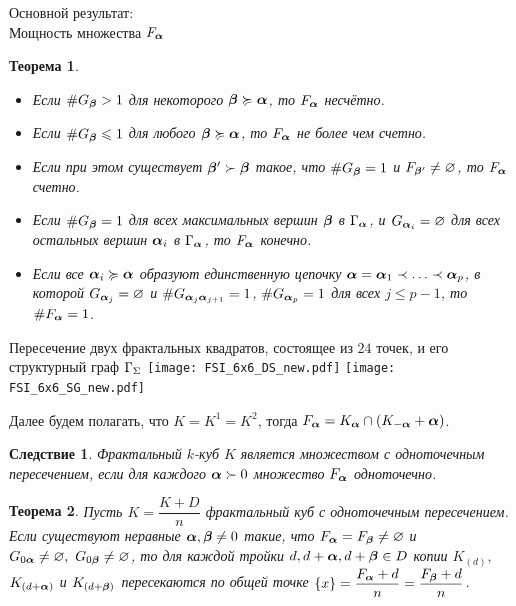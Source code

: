 \documentclass[aspectratio=1610, 10pt, notheorems]{beamer}
\newtheorem{theorem}     {Теорема}
\newtheorem{corollary}   {Следствие}
\begin{document}
\begin{frame}{Основной результат:\\Мощность множества $F_{\bm{\alpha}}$}
\begin{theorem}
\begin{itemize}[nolistsep]
\item[(1)] Если $\#G_{\bm{\beta}}>1$ для некоторого ${\bm{\beta}}\succcurlyeq{\bm{\alpha}}$, то  $F_{\bm{\alpha}}$ несчётно.

\item[(2a)] Если  $\#G_{\bm{\beta}}\leqslant1$ для любого ${\bm{\beta}}\succcurlyeq{\bm{\alpha}}$, то  $F_{\bm{\alpha}}$ не более чем счетно.

\item[(2b)] Если при этом существует ${\bm{\beta}}'\succ{\bm{\beta}}$ такое, что $\#G_{\bm{\beta}}=1$ и $F_{{\bm{\beta}}'}\neq\varnothing$, то $F_{\bm{\alpha}}$ счетно.

\item[(3)] Если  $\#G_{\bm{\beta}}=1$ для всех максимальных вершин ${\bm{\beta}}$ в $\Gamma_{\bm{\alpha}}$, и $G_{{\bm{\alpha}}_i}=\varnothing$ для всех остальных вершин ${\bm{\alpha}}_i$ в $\Gamma_{\bm{\alpha}}$, то $F_{\bm{\alpha}}$ конечно.

\item[(4)] Если все ${\bm{\alpha}}_i\succcurlyeq{\bm{\alpha}}$ образуют единственную цепочку ${\bm{\alpha}}={\bm{\alpha}}_1\prec\ldots\prec{\bm{\alpha}}_p$, в которой $G_{{\bm{\alpha}}_j}=\varnothing$ и $\# G_{{\bm{\alpha}}_j{\bm{\alpha}}_{j+1}}=1$, $\#G_{{\bm{\alpha}}_p}=1$ для всех $j\le p-1$, то $\#F_{\bm{\alpha}}=1$.
\end{itemize}
\end{theorem}
\end{frame}

\begin{frame}{Пересечение двух фрактальных квадратов, состоящее из $24$ точек, и его структурный граф $\Gamma_\Sigma$}
\texttt{[image: FSI\_6x6\_DS\_new.pdf]}
\hfill
\texttt{[image: FSI\_6x6\_SG\_new.pdf]}
\end{frame}

\begin{frame}{}
Далее будем полагать, что $K=K^1=K^2$, тогда $F_{\bm{\alpha}}=K_{\bm{\alpha}}\cap(K_{-{\bm{\alpha}}}+{\bm{\alpha}})$.
\begin{corollary}
Фрактальный $k$-куб $K$ является множеством с одноточечным пересечением, если для каждого ${\bm{\alpha}}\succ0$ множество $F_{\bm{\alpha}}$ одноточечно.
\end{corollary}
\begin{theorem}
Пусть $K=\dfrac{K+D}{n}$ фрактальный куб с одноточечным пересечением. 
Если существуют неравные ${\bm{\alpha}},{\bm{\beta}}\neq0$ такие, что $F_{\bm{\alpha}}=F_{\bm{\beta}}\neq\varnothing$ и $G_{0{\bm{\alpha}}}\neq\varnothing,\ G_{0{\bm{\beta}}}\neq\varnothing$,  то для каждой тройки $d, d+{\bm{\alpha}}, d+{\bm{\beta}}\in D$ копии $K_{(d)},$ $K_{(d+{\bm{\alpha}})}$ и $K_{(d+{\bm{\beta}})}$ пересекаются по общей точке $\{x\}=\dfrac{F_{\bm{\alpha}}+d}{n}=\dfrac{F_{\bm{\beta}}+d}{n}$.
\end{theorem}
\end{frame}
\end{document}
